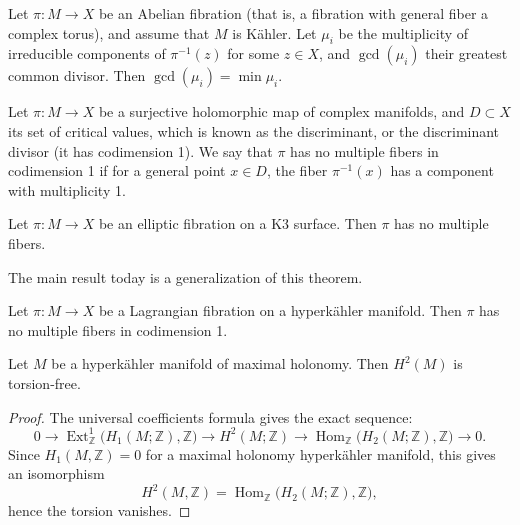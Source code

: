 \begin{theorem}
\label{theorem-campana-kamenova-verbitsky}
Let \(\pi : M \to X\) be an Abelian
fibration (that is, a fibration with general
fiber a complex torus), and assume that
\(M\) is K\"ahler. Let \(\mu_i\) be the
multiplicity of irreducible components of
\(\pi^{-1}(z)\) for some \(z \in X\), and
\(\gcd(\mu_i)\) their greatest common
divisor. Then \(\gcd(\mu_i)=\min \mu_i\).
\end{theorem}

\begin{definition}
\label{definition-discriminant}
Let \(\pi : M \to X\) be a surjective
holomorphic map of complex manifolds, and
\(D \subset X\) its set of critical values,
which is known as the discriminant, or the
discriminant divisor (it has codimension
1). We say that \(\pi\) has no multiple
fibers in codimension 1 if for a general
point \(x \in D\), the fiber \(\pi^{-1}(x)\)
has a component with multiplicity 1.
\end{definition}

\begin{theorem}
\label{theorem-elliptic-k3-no-multiple-fibers}
Let \(\pi : M \to X\) be an elliptic
fibration on a K3 surface. Then \(\pi\) has
no multiple fibers.
\end{theorem}

\medskip\noindent
The main result today is a generalization of
this theorem.

\begin{theorem}
\label{theorem-main-no-multiple-fibers}
Let \(\pi : M \to X\) be a Lagrangian
fibration on a hyperk\"ahler manifold. Then
\(\pi\) has no multiple fibers in
codimension 1.
\end{theorem}

\begin{lemma}
\label{lemma-h2-torsion-free}
Let \(M\) be a hyperk\"ahler manifold of
maximal holonomy. Then \(H^2(M)\) is
torsion-free.
\end{lemma}

\begin{proof}
The universal coefficients formula gives the
exact sequence:
$$
0 \to \operatorname{Ext}_{\mathbb{Z}}^1
\bigl(H_1(M;\mathbb{Z}),\mathbb{Z}\bigr)
\to H^2(M;\mathbb{Z}) \to
\operatorname{Hom}_{\mathbb{Z}}
\bigl(H_2(M;\mathbb{Z}),\mathbb{Z}\bigr)
\to 0.
$$
Since \(H_1(M,\mathbb{Z})=0\) for a maximal
holonomy hyperk\"ahler manifold, this gives
an isomorphism
\[
H^2(M,\mathbb{Z}) =
\operatorname{Hom}_{\mathbb{Z}}
\bigl(H_2(M;\mathbb{Z}),\mathbb{Z}\bigr),
\]
hence the torsion vanishes.
\end{proof}

